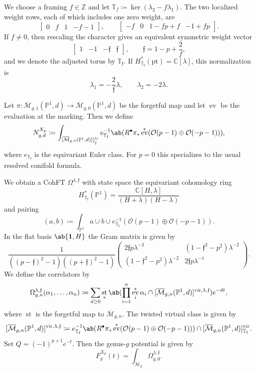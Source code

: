 \documentclass{amsart}
\theoremstyle{definition}
\theoremstyle{remark}
\theoremstyle{plain}
\theoremstyle{definition}
\theoremstyle{remark}
\newcommand{\C}{\mathbb{C}}
\newcommand{\Z}{\mathbb{Z}}
\renewcommand{\P}{\mathbb{P}}
\newcommand{\Mbar}{\overline{\mathcal{M}}}
\newcommand{\mc}[1]{\mathcal{#1}}
\newcommand{\T}{\mathbb{T}}
\newcommand{\mf}[1]{\mathfrak{#1}}
\newcommand{\mr}[1]{\mathrm{#1}}
\newcommand{\1}{\mathbf{1}}
\newcommand{\2}{\mathbf{2}}
\newcommand{\3}{\mathbf{3}}
\newcommand{\vir}{\mr{vir}}
\DeclareMathOperator{\ev}{ev}
\DeclareMathOperator{\st}{st}
\begin{document}
We choose a framing \(f \in \Z\) and let \(\T_f \coloneqq \ker(\lambda_2 - f\lambda_1)\). The two localized weight rows, each of which includes one zero weight, are
\[ \begin{bmatrix} 0 & f & 1 & -f-1 \end{bmatrix}, \qquad \begin{bmatrix} -f & 0 & 1-fp+f & -1+fp \end{bmatrix}. \]
If \(f \neq 0\), then rescaling the character gives an equivalent symmetric weight vector
\[ \begin{bmatrix} 1 & -1 & -\mf{f} & \mf{f} \end{bmatrix}, \qquad \mf{f} = 1-p+\frac{2}{f}, \]
and we denote the adjusted torus by \(\T_{\mf{f}}\). If \(H^*_{\T_{\mf{f}}}(\mr{pt}) = \C[\lambda]\), this normalization is
\[ \lambda_1 = -\frac{2}{\mf{f}}\lambda, \qquad \lambda_2 = -2\lambda. \]

Let \(\pi \colon \Mbar_{g,1}(\P^1,d) \to \Mbar_{g,0}(\P^1,d)\) be the forgetful map and let \(\ev\) be the evaluation at the marking. Then we define
\[ N^{X_p}_{g,d} \coloneqq \int_{[\Mbar_{g,0}(\P^1,d)]^{\vir}_{\T_{\mf{f}}}} e_{\T_{\mf{f}}}^{-1}\ab(R^{\bullet}\pi_* \ev^*(\mc{O}(p-1)\oplus\mc{O}(-p-1))), \]
where \(e_{\T_{\mf{f}}}\) is the equivariant Euler class. For \(p=0\) this specializes to the usual resolved conifold formula.

We obtain a CohFT \(\Omega^{\lambda,\mf{f}}\) with state space the equivariant cohomology ring
\[ H^*_{\T_{\mf{f}}}(\P^1) = \frac{\C[H,\lambda]}{(H+\lambda)(H-\lambda)} \]
and pairing
\[ (a,b) \coloneqq \int_{\P^1} a \cup b \cup e^{-1}_{\T_{\mf{f}}}(\mc{O}(p-1)\oplus\mc{O}(-p-1)). \]
In the flat basis \(\ab\{\1,H\}\) the Gram matrix is given by
\[ \frac{1}{((p-\mf{f})^2-1)((p+\mf{f})^2-1)}\begin{pmatrix} 2\mf{f}p\lambda^{-3} & (1-\mf{f}^2-p^2)\lambda^{-2} \\ (1-\mf{f}^2-p^2)\lambda^{-2} & 2\mf{f}p\lambda^{-1} \end{pmatrix}. \]
We define the correlators by
\[ \Omega^{\lambda,\mf{f}}_{g,n}(\alpha_1,\ldots,\alpha_n) \coloneqq \sum_{d\geq0}\st_*\ab(\prod_{i=1}^n \ev_i^*\alpha_i \cap [\Mbar_{g,n}(\P^1,d)]^{\vir,\lambda,\mf{f}})e^{-dt}, \]
where \(\st\) is the forgetful map to \(\Mbar_{g,n}\). The twisted virtual class is given by
\[ [\Mbar_{g,n}(\P^1,d)]^{\vir,\lambda,\mf{f}} \coloneqq e^{-1}_{\T_{\mf{f}}}\ab(R^{\bullet}\pi_*\ev^*(\mc{O}(p-1)\oplus\mc{O}(-p-1))) \cap [\Mbar_{g,n}(\P^1,d)]^{\vir}_{\T_{\mf{f}}}. \]
Set \(Q = (-1)^{p+1}e^{-t}\). Then the genus-\(g\) potential is given by
\[ F^{X_p}_g(t) = \int_{\Mbar_g} \Omega^{\lambda,\mf{f}}_{g,0}. \]
\end{document}
